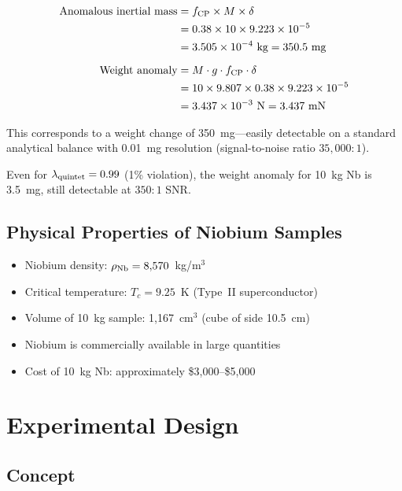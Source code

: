 \documentclass[12pt,a4paper]{article}
\theoremstyle{definition}
\theoremstyle{remark}
\begin{document}
\begin{tcolorbox}[title={Reference Calculation}]
\begin{align}
\text{Anomalous inertial mass} &= f_{\rm CP} \times M \times \delta \notag\\
&= 0.38 \times 10 \times 9.223 \times 10^{-5} \notag\\
&= 3.505 \times 10^{-4}~\text{kg} = 350.5~\text{mg} \\[6pt]
\text{Weight anomaly} &= M \cdot g \cdot f_{\rm CP} \cdot \delta \notag\\
&= 10 \times 9.807 \times 0.38 \times 9.223 \times 10^{-5} \notag\\
&= 3.437 \times 10^{-3}~\text{N} = 3.437~\text{mN}
\end{align}
\end{tcolorbox}

This corresponds to a weight change of 350~mg---easily detectable on a standard
analytical balance with 0.01~mg resolution (signal-to-noise ratio $35{,}000\!:\!1$).

Even for $\lambda_{\rm quintet} = 0.99$ (1\% violation), the weight anomaly
for 10~kg Nb is 3.5~mg, still detectable at $350\!:\!1$ SNR.

\subsection{Physical Properties of Niobium Samples}

\begin{itemize}
\item Niobium density: $\rho_{\rm Nb} = 8{,}570$~kg/m$^3$
\item Critical temperature: $T_c = 9.25$~K (Type~II superconductor)
\item Volume of 10~kg sample: 1{,}167~cm$^3$ (cube of side 10.5~cm)
\item Niobium is commercially available in large quantities
\item Cost of 10~kg Nb: approximately \$3{,}000--\$5{,}000
\end{itemize}

\section{Experimental Design}\label{sec:experiment}

\subsection{Concept}
\end{document}
